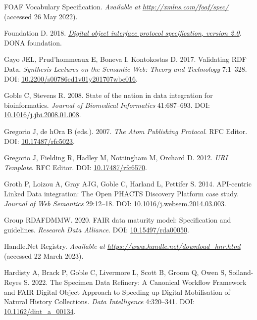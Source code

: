 \begin{CSLReferences}{1}{0}
\leavevmode{}%
FOAF Vocabulary Specification. \emph{Available at} \href{http://xmlns.com/foaf/spec/}{\emph{http://xmlns.com/foaf/spec/}} (accessed 26 May 2022).

\leavevmode{}%
Foundation D. 2018. \emph{\href{https://hdl.handle.net/0.DOIP/DOIPV2.0}{Digital object interface protocol specification, version 2.0}}. DONA foundation.

\leavevmode{}%
Gayo JEL, Prud'hommeaux E, Boneva I, Kontokostas D. 2017. Validating RDF Data. \emph{Synthesis Lectures on the Semantic Web: Theory and Technology} 7:1--328. DOI: \href{https://doi.org/10.2200/s00786ed1v01y201707wbe016}{10.2200/s00786ed1v01y201707wbe016}.

\leavevmode{}%
Goble C, Stevens R. 2008. State of the nation in data integration for bioinformatics. \emph{Journal of Biomedical Informatics} 41:687--693. DOI: \href{https://doi.org/10.1016/j.jbi.2008.01.008}{10.1016/j.jbi.2008.01.008}.

\leavevmode{}%
Gregorio J, de hOra B (eds.). 2007. \emph{The Atom Publishing Protocol}. RFC Editor. DOI: \href{https://doi.org/10.17487/rfc5023}{10.17487/rfc5023}.

\leavevmode{}%
Gregorio J, Fielding R, Hadley M, Nottingham M, Orchard D. 2012. \emph{URI Template}. RFC Editor. DOI: \href{https://doi.org/10.17487/rfc6570}{10.17487/rfc6570}.

\leavevmode{}%
Groth P, Loizou A, Gray AJG, Goble C, Harland L, Pettifer S. 2014. API-centric Linked Data integration: The Open PHACTS Discovery Platform case study. \emph{Journal of Web Semantics} 29:12--18. DOI: \href{https://doi.org/10.1016/j.websem.2014.03.003}{10.1016/j.websem.2014.03.003}.

\leavevmode{}%
Group RDAFDMMW. 2020. FAIR data maturity model: Specification and guidelines. \emph{Research Data Alliance}. DOI: \href{https://doi.org/10.15497/rda00050}{10.15497/rda00050}.

\leavevmode{}%
Handle.Net Registry. \emph{Available at} \href{https://www.handle.net/download_hnr.html}{\emph{https://www.handle.net/download\_hnr.html}} (accessed 22 March 2023).

\leavevmode{}%
Hardisty A, Brack P, Goble C, Livermore L, Scott B, Groom Q, Owen S, Soiland-Reyes S. 2022. The Specimen Data Refinery: A Canonical Workflow Framework and FAIR Digital Object Approach to Speeding up Digital Mobilisation of Natural History Collections. \emph{Data Intelligence} 4:320--341. DOI: \href{https://doi.org/10.1162/dint_a_00134}{10.1162/dint\_a\_00134}.


\end{CSLReferences}
